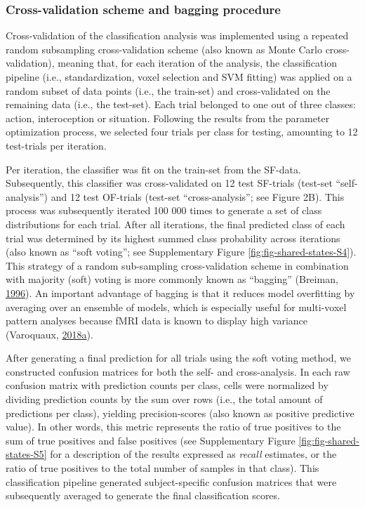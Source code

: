 \documentclass[11pt,american,a4paper,oneside,]{memoir} %
\begin{document}
\hypertarget{shared-states-methods-mvpa-cv-and-bagging}{%
\subsubsection{Cross-validation scheme and bagging procedure}\label{shared-states-methods-mvpa-cv-and-bagging}}

Cross-validation of the classification analysis was implemented using a repeated random subsampling cross-validation scheme (also known as Monte Carlo cross-validation), meaning that, for each iteration of the analysis, the classification pipeline (i.e., standardization, voxel selection and SVM fitting) was applied on a random subset of data points (i.e., the train-set) and cross-validated on the remaining data (i.e., the test-set). Each trial belonged to one out of three classes: action, interoception or situation. Following the results from the parameter optimization process, we selected four trials per class for testing, amounting to 12 test-trials per iteration.

Per iteration, the classifier was fit on the train-set from the SF-data. Subsequently, this classifier was cross-validated on 12 test SF-trials (test-set ``self-analysis'') and 12 test OF-trials (test-set ``cross-analysis''; see Figure 2B). This process was subsequently iterated 100 000 times to generate a set of class distributions for each trial. After all iterations, the final predicted class of each trial was determined by its highest summed class probability across iterations (also known as ``soft voting''; see Supplementary Figure \ref{fig:fig-shared-states-S4}). This strategy of a random sub-sampling cross-validation scheme in combination with majority (soft) voting is more commonly known as ``bagging'' (Breiman, \protect\hyperlink{ref-breiman1996bagging}{1996}). An important advantage of bagging is that it reduces model overfitting by averaging over an ensemble of models, which is especially useful for multi-voxel pattern analyses because fMRI data is known to display high variance (Varoquaux, \protect\hyperlink{ref-varoquaux2018cross}{2018}\protect\hyperlink{ref-varoquaux2018cross}{a}).

After generating a final prediction for all trials using the soft voting method, we constructed confusion matrices for both the self- and cross-analysis. In each raw confusion matrix with prediction counts per class, cells were normalized by dividing prediction counts by the sum over rows (i.e., the total amount of predictions per class), yielding precision-scores (also known as positive predictive value). In other words, this metric represents the ratio of true positives to the sum of true positives and false positives (see Supplementary Figure \ref{fig:fig-shared-states-S5} for a description of the results expressed as \emph{recall} estimates, or the ratio of true positives to the total number of samples in that class). This classification pipeline generated subject-specific confusion matrices that were subsequently averaged to generate the final classification scores.
\end{document}
